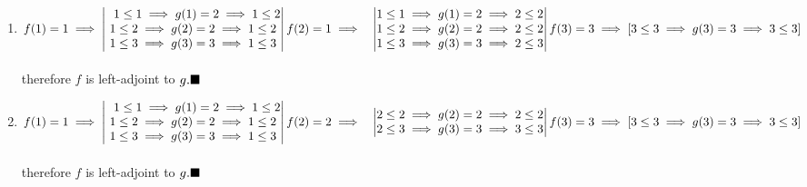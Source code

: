 \documentclass{article}
\begin{document}
\begin{enumerate}
	\item $f(1)=1\implies 
\begin{vmatrix} \ \ 
	1\leq 1\implies g(1)=2\implies 1\leq 2\\
	1\leq 2\implies g(2)=2\implies 1\leq 2\\
	1\leq 3\implies g(3)=3\implies 1\leq 3
\end{vmatrix}\\
 \\
f(2)=1\implies \ \ 
\begin{vmatrix}
	1\leq 1\implies g(1)=2\implies 2\leq 2\\
	1\leq 2\implies g(2)=2\implies 2\leq 2\\
	1\leq 3\implies g(3)=3\implies 2\leq 3
\end{vmatrix}\\
f(3)=3\implies \left[ 3\leq 3\implies g(3)=3\implies 3\leq 3\right]
$\\
 \\
therefore $f$ is left-adjoint to $g.\hfill\blacksquare$
\item $f(1)=1\implies 
\begin{vmatrix} \ \ 
	1\leq 1\implies g(1)=2\implies 1\leq 2\\
	1\leq 2\implies g(2)=2\implies 1\leq 2\\
	1\leq 3\implies g(3)=3\implies 1\leq 3
\end{vmatrix}\\
 \\
f(2)=2\implies \ \ 
\begin{vmatrix}
	2\leq 2\implies g(2)=2\implies 2\leq 2\\
	2\leq 3\implies g(3)=3\implies 3\leq 3
\end{vmatrix}\\
 \\
f(3)=3\implies \left[ 3\leq 3\implies g(3)=3\implies 3\leq 3\right]
$\\
 \\
therefore $f$ is left-adjoint to $g.\hfill\blacksquare$
\end{enumerate}
 \newpage
\end{document}
